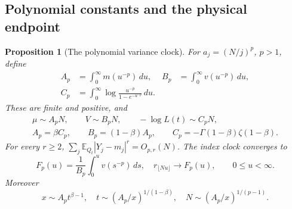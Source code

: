 \documentclass[11pt,a4paper]{article}
\numberwithin{equation}{section}
\newtheorem{proposition}[theorem]{Proposition}
\theoremstyle{definition}
\theoremstyle{remark}
\newcommand{\E}{\mathbb E}
\begin{document}
\subsection{Polynomial constants and the physical endpoint}
\begin{proposition}[The polynomial variance clock]
\label{prop:constants}
For $a_j=(N/j)^p$, $p>1$, define
\begin{align}
 A_p&=\int_0^\infty m(u^{-p})\,du,&
 B_p&=\int_0^\infty v(u^{-p})\,du, \label{eq:AB}\\
 C_p&=\int_0^\infty\log\frac{u^{-p}}{1-e^{-u^{-p}}}\,du.
 \label{eq:C}
\end{align}
These are finite and positive, and
\begin{gather}
 \mu\sim A_pN,\qquad V\sim B_pN,\qquad -\log L(t)\sim C_pN,
 \label{eq:dimension}\\
 A_p=\beta C_p,\qquad B_p=(1-\beta)A_p,\qquad
 C_p=-\Gamma(1-\beta)\zeta(1-\beta). \label{eq:constants}
\end{gather}
For every $r\ge2$, $\sum_j\E_{Q_t}|Y_j-m_j|^r=O_{p,r}(N)$.
The index clock converges to
\begin{equation}
 F_p(u)=\frac1{B_p}\int_0^u v(s^{-p})\,ds,\quad
 r_{\lfloor Nu\rfloor}\to F_p(u),\qquad 0\le u<\infty.
 \label{eq:indexclock}
\end{equation}
Moreover
\begin{equation}
 x\sim A_p t^{\beta-1},\quad
 t\sim(A_p/x)^{1/(1-\beta)},\quad
 N\sim(A_p/x)^{1/(p-1)}. \label{eq:xscale}
\end{equation}
\end{proposition}
\end{document}

